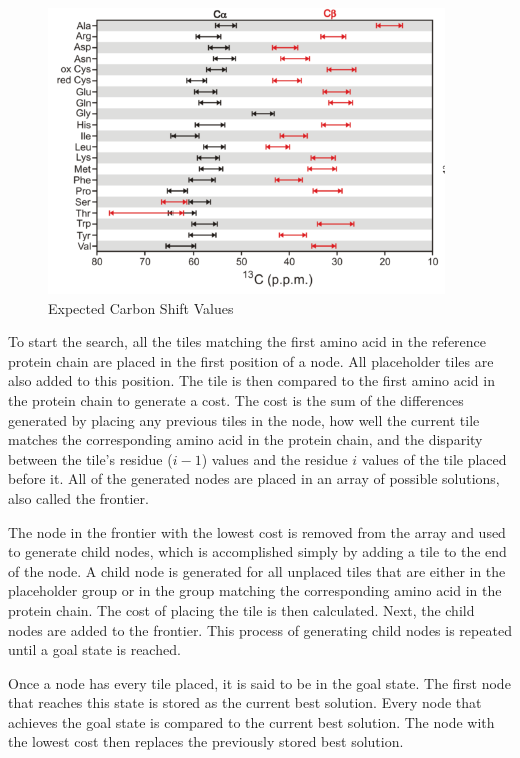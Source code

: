 \documentclass[12pt, letter]{article}
\begin{document}
\begin{figure}[H]
\begin{center}
\includegraphics{carbon}
\end{center}
\caption{Expected Carbon Shift Values \cite{carbon}} %
\label{fig:carbon}
\end{figure}

To start the search,  all the tiles matching the first amino acid in the reference protein chain are placed in the first position of a node. All placeholder tiles are also added to this position. The tile is then compared to the first amino acid in the protein chain to generate a cost. The cost is the sum of the differences generated by placing any previous tiles in the node, how well the current tile matches the corresponding amino acid in the protein chain, and the disparity between the tile's residue ($i-1$) values and the residue $i$ values of the tile placed before it. All of the generated nodes are placed in an array of possible solutions, also called the frontier. 

The node in the frontier with the lowest cost is removed from the array and used to generate child nodes, which is accomplished simply by adding a tile to the end of the node. A child node is generated for all unplaced tiles that are either in the placeholder group or in the group matching the corresponding amino acid in the protein chain. The cost of placing the tile is then calculated.  Next, the child nodes are added to the frontier. This process of generating child nodes is repeated until a goal state is reached. 

Once a node has every tile placed, it is said to be in the goal state. The first node that reaches this state is stored as the current best solution. Every node that achieves the goal state is compared to the current best solution. The node with the lowest cost then replaces the previously stored best solution. 
\end{document}
